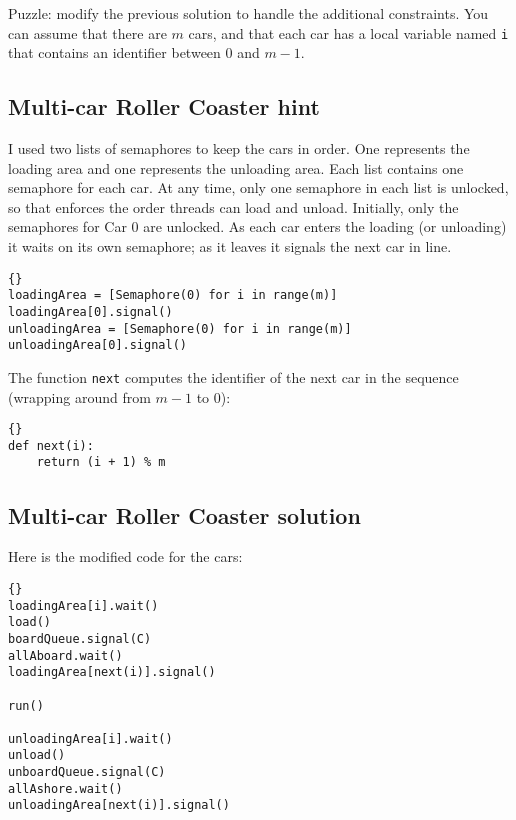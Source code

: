 \documentclass{book}
\newcommand{\clearemptydoublepage}{\newpage\cleardoublepage}
\begin{document}
Puzzle: modify
the previous solution to handle the additional constraints.
You can assume that there are $m$ cars, and that
each car has a local variable named {\tt i}
that contains an identifier between 0 and $m-1$.


\clearemptydoublepage
\subsection{Multi-car Roller Coaster hint}

I used two lists of semaphores to keep the cars in order.  One
represents the loading area and one represents the unloading area.
Each list contains one semaphore for each car.
At any time, only one semaphore in each
list is unlocked, so that enforces the order threads can
load and unload.
Initially, only the semaphores for Car 0 are unlocked.
As each car enters the
loading (or unloading) it waits on its own semaphore; as it leaves it
signals the next car in line.

\begin{lstlisting}[title={Multi-car Roller Coaster hint}]{}
loadingArea = [Semaphore(0) for i in range(m)]
loadingArea[0].signal()
unloadingArea = [Semaphore(0) for i in range(m)]
unloadingArea[0].signal()
\end{lstlisting}

The function {\tt next} computes the identifier of the next
car in the sequence (wrapping around from $m-1$ to 0):

\begin{lstlisting}[title={Implementation of {\tt next}}]{}
def next(i):
    return (i + 1) % m
\end{lstlisting}



\clearemptydoublepage
\subsection{Multi-car Roller Coaster solution}

Here is the modified code for the cars:

\begin{lstlisting}[title={Multi-car Roller Coaster solution (car)}]{}
loadingArea[i].wait()
load()
boardQueue.signal(C)
allAboard.wait()
loadingArea[next(i)].signal()

run()

unloadingArea[i].wait()
unload()
unboardQueue.signal(C)
allAshore.wait()
unloadingArea[next(i)].signal()
\end{lstlisting}
\end{document}
